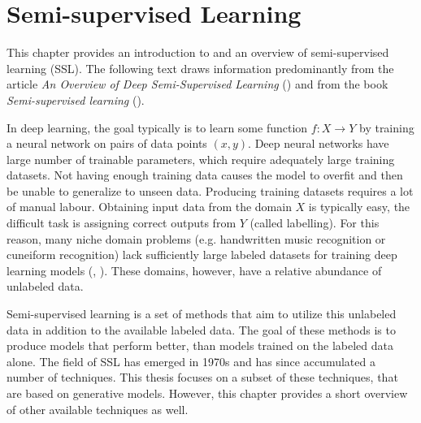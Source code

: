 \chapter{Semi-supervised Learning}
\label{chap:SemisupervisedLearning}

This chapter provides an introduction to and an overview of semi-supervised learning (SSL). The following text draws information predominantly from the article \emph{An Overview of Deep Semi-Supervised Learning} (\cite{SemisupervisedOverview}) and from the book \emph{Semi-supervised learning} (\cite{SslBook}).

In deep learning, the goal typically is to learn some function $f: X \rightarrow Y$ by training a neural network on pairs of data points $(x, y)$. Deep neural networks have large number of trainable parameters, which require adequately large training datasets. Not having enough training data causes the model to overfit and then be unable to generalize to unseen data. Producing training datasets requires a lot of manual labour. Obtaining input data from the domain $X$ is typically easy, the difficult task is assigning correct outputs from $Y$ (called labelling). For this reason, many niche domain problems (e.g. handwritten music recognition or cuneiform recognition) lack sufficiently large labeled datasets for training deep learning models (\cite{MuscimaPP}, \cite{Cuneiforms}). These domains, however, have a relative abundance of unlabeled data.

Semi-supervised learning is a set of methods that aim to utilize this unlabeled data in addition to the available labeled data. The goal of these methods is to produce models that perform better, than models trained on the labeled data alone. The field of SSL has emerged in 1970s and has since accumulated a number of techniques. This thesis focuses on a subset of these techniques, that are based on generative models. However, this chapter provides a short overview of other available techniques as well.

